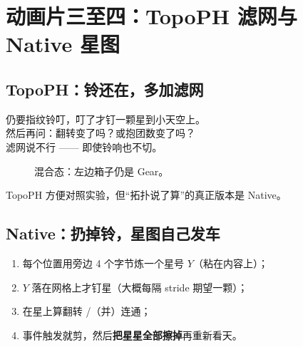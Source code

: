 \chapter{动画片三至四：TopoPH 滤网与 Native 星图}
\label{ch:N-phn-cartoon}

\section{TopoPH：铃还在，多加滤网}

\begin{metaphor}[安检加一道]
仍要指纹铃叮，叮了才钉一颗星到小天空上。\\
然后再问：翻转变了吗？或抱团数变了吗？\\
滤网说不行 —— 即使铃响也不切。
\end{metaphor}

\begin{figure}[htbp]
\centering
{}
\caption{混合态：左边箱子仍是 Gear。}
\label{fig:N-ph-flow}
\end{figure}

\begin{pitfall}[它不是终点]
TopoPH 方便对照实验，但``拓扑说了算''的真正版本是 Native。
\end{pitfall}

\section{Native：扔掉铃，星图自己发车}

\begin{enumerate}
  \item 每个位置用旁边 4 个字节炼一个星号 $Y$（粘在内容上）；
  \item $Y$ 落在网格上才钉星（大概每隔 stride 期望一颗）；
  \item 在星上算翻转 /（并）连通；
  \item 事件触发就剪，然后\textbf{把星星全部擦掉}再重新看天。
\end{enumerate}

